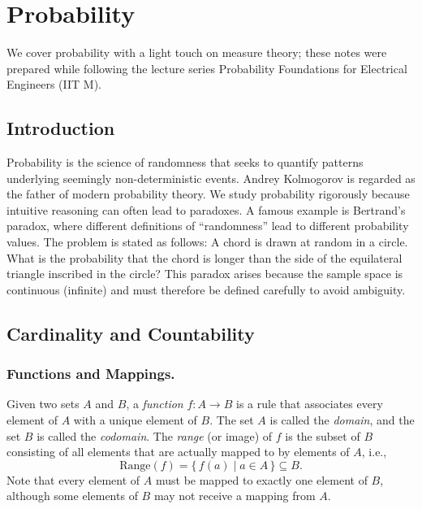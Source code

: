 \section{Probability}
\label{sec:probability}

We cover probability with a light touch on measure theory; these notes were prepared while following the lecture series Probability Foundations for Electrical Engineers (IIT M).

\subsection{Introduction}

Probability is the science of randomness that seeks to quantify patterns underlying seemingly non-deterministic events. Andrey Kolmogorov is regarded as the father of modern probability theory. We study probability rigorously because intuitive reasoning can often lead to paradoxes. A famous example is Bertrand’s paradox, where different definitions of “randomness” lead to different probability values. The problem is stated as follows: A chord is drawn at random in a circle. What is the probability that the chord is longer than the side of the equilateral triangle inscribed in the circle? This paradox arises because the sample space is continuous (infinite) and must therefore be defined carefully to avoid ambiguity.

\subsection{Cardinality and Countability}

\subsubsection{Functions and Mappings.}
Given two sets \( A \) and \( B \), a \emph{function} \( f: A \to B \) is a rule that associates every element of \( A \) with a unique element of \( B \).  
The set \( A \) is called the \emph{domain}, and the set \( B \) is called the \emph{codomain}.  
The \emph{range} (or image) of \( f \) is the subset of \( B \) consisting of all elements that are actually mapped to by elements of \( A \), i.e.,
\[
\mathrm{Range}(f) = \{\, f(a) \mid a \in A \,\} \subseteq B.
\]
Note that every element of \( A \) must be mapped to exactly one element of \( B \), although some elements of \( B \) may not receive a mapping from \( A \).

